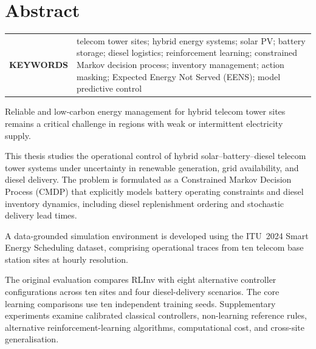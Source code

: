 \chapter*{Abstract}

\begin{tabular}{@{} >{\bfseries}p{} p{} @{}}
\texorpdfstring{\MakeUppercase{Keywords}}{Keywords} &
telecom tower sites; hybrid energy systems; solar PV; battery storage;
diesel logistics; reinforcement learning; constrained Markov decision process;
inventory management; action masking; Expected Energy Not Served (EENS);
model predictive control
\end{tabular}
\par
\begin{doublespacing}

Reliable and low-carbon energy management for hybrid telecom tower sites
remains a critical challenge in regions with weak or intermittent electricity
supply. 

This thesis studies the operational control of hybrid
solar--battery--diesel telecom tower systems under uncertainty in renewable
generation, grid availability, and diesel delivery. The problem is formulated
as a Constrained Markov Decision Process (CMDP) that explicitly models
battery operating constraints and diesel inventory dynamics, including diesel replenishment ordering and stochastic delivery lead times.

A data-grounded simulation environment is developed using the ITU~2024
Smart Energy Scheduling dataset, comprising operational traces from ten
telecom base station sites at hourly resolution. 

\begin{revisedblock}
The original evaluation compares RLInv with eight
alternative controller configurations across ten
sites and four diesel-delivery scenarios. The core
learning comparisons use ten independent training
seeds. Supplementary experiments examine calibrated
classical controllers, non-learning reference rules,
alternative reinforcement-learning algorithms,
computational cost, and cross-site generalisation.


\end{revisedblock}
\end{doublespacing}
